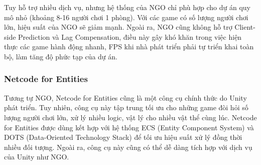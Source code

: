 Tuy hỗ trợ nhiều dịch vụ, nhưng hệ thống của NGO chỉ phù hợp cho dự án quy mô nhỏ (khoảng 8-16 người chơi 1 phòng). Với các game có số lượng người chơi lớn, hiệu suất của NGO sẽ giảm mạnh. Ngoài ra, NGO cũng không hỗ trợ Client-side Prediction và Lag Compensation, điều này gây khó khăn trong việc hiện thực các game hành động nhanh, FPS khi nhà phát triển phải tự triển khai toàn bộ, làm tăng độ phức tạp của dự án.
\subsubsection{Netcode for Entities}
Tương tự NGO, Netcode for Entities cũng là một công cụ chính thức do Unity phát triển. Tuy nhiên, công cụ này tập trung tối ưu cho những game đòi hỏi số lượng người chơi lớn, xử lý nhiều logic, vật lý cho nhiều vật thể cùng lúc. Netcode for Entities được dùng kết hợp với hệ thống ECS (Entity Component System) và DOTS (Data-Oriented Technology Stack) để tối ưu hiệu suất xử lý đồng thời nhiều đối tượng. Ngoài ra, công cụ này cũng có thể dễ dàng tích hợp với dịch vụ của Unity như NGO.